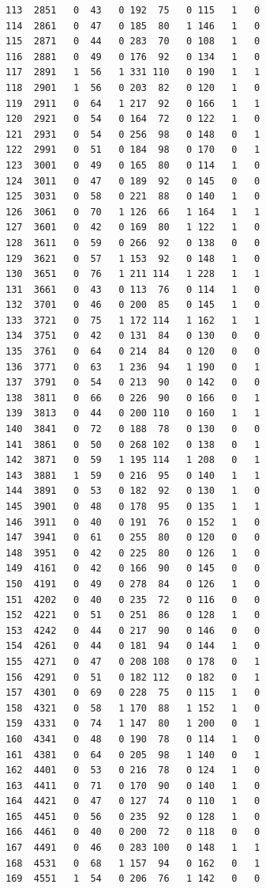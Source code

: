 \documentclass[
  letterpaper,
]{scrbook}
\begin{document}
\begin{verbatim}
113  2851   0  43   0 192  75   0 115   1   0
114  2861   0  47   0 185  80   1 146   1   0
115  2871   0  44   0 283  70   0 108   1   0
116  2881   0  49   0 176  92   0 134   1   0
117  2891   1  56   1 331 110   0 190   1   1
118  2901   1  56   0 203  82   0 120   1   0
119  2911   0  64   1 217  92   0 166   1   1
120  2921   0  54   0 164  72   0 122   1   0
121  2931   0  54   0 256  98   0 148   0   1
122  2991   0  51   0 184  98   0 170   0   1
123  3001   0  49   0 165  80   0 114   1   0
124  3011   0  47   0 189  92   0 145   0   0
125  3031   0  58   0 221  88   0 140   1   0
126  3061   0  70   1 126  66   1 164   1   1
127  3601   0  42   0 169  80   1 122   1   0
128  3611   0  59   0 266  92   0 138   0   0
129  3621   0  57   1 153  92   0 148   1   0
130  3651   0  76   1 211 114   1 228   1   1
131  3661   0  43   0 113  76   0 114   1   0
132  3701   0  46   0 200  85   0 145   1   0
133  3721   0  75   1 172 114   1 162   1   1
134  3751   0  42   0 131  84   0 130   0   0
135  3761   0  64   0 214  84   0 120   0   0
136  3771   0  63   1 236  94   1 190   0   1
137  3791   0  54   0 213  90   0 142   0   0
138  3811   0  66   0 226  90   0 166   0   1
139  3813   0  44   0 200 110   0 160   1   1
140  3841   0  72   0 188  78   0 130   0   0
141  3861   0  50   0 268 102   0 138   0   1
142  3871   0  59   1 195 114   1 208   0   1
143  3881   1  59   0 216  95   0 140   1   1
144  3891   0  53   0 182  92   0 130   1   0
145  3901   0  48   0 178  95   0 135   1   1
146  3911   0  40   0 191  76   0 152   1   0
147  3941   0  61   0 255  80   0 120   0   0
148  3951   0  42   0 225  80   0 126   1   0
149  4161   0  42   0 166  90   0 145   0   0
150  4191   0  49   0 278  84   0 126   1   0
151  4202   0  40   0 235  72   0 116   0   0
152  4221   0  51   0 251  86   0 128   1   0
153  4242   0  44   0 217  90   0 146   0   0
154  4261   0  44   0 181  94   0 144   1   0
155  4271   0  47   0 208 108   0 178   0   1
156  4291   0  51   0 182 112   0 182   0   1
157  4301   0  69   0 228  75   0 115   1   0
158  4321   0  58   1 170  88   1 152   1   0
159  4331   0  74   1 147  80   1 200   0   1
160  4341   0  48   0 190  78   0 114   1   0
161  4381   0  64   0 205  98   1 140   0   1
162  4401   0  53   0 216  78   0 124   1   0
163  4411   0  71   0 170  90   0 140   1   0
164  4421   0  47   0 127  74   0 110   1   0
165  4451   0  56   0 235  92   0 128   1   0
166  4461   0  40   0 200  72   0 118   0   0
167  4491   0  46   0 283 100   0 148   1   1
168  4531   0  68   1 157  94   0 162   0   1
169  4551   1  54   0 206  76   1 142   0   0

\end{verbatim}
\end{document}
